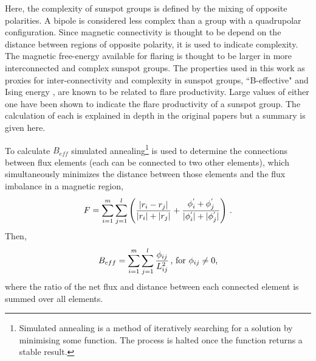 Here, the complexity of sunspot groups is defined by the mixing of opposite polarities. A bipole is considered less complex than a group with a quadrupolar configuration. Since magnetic connectivity is thought to be depend on the distance between regions of opposite polarity, it is used to indicate complexity. The magnetic free-energy available for flaring is thought to be larger in more interconnected and complex sunspot groups\citep{Schrijver:2009,Falconer:2009,Georgoulis:2007}. The properties used in this work as proxies for inter-connectivity and complexity in sunspot groups, ``B-effective"  \citep[$B_{eff}$;][]{Georgoulis:2007} and Ising energy \citep{Ahmed:2010}, are known to be related to flare productivity. Large values of either one have been shown to indicate the flare productivity of a sunspot group. The calculation of each is explained in depth in the original papers but a summary is given here. 

To calculate $B_{eff}$ simulated annealing\footnote{Simulated annealing is a method of iteratively searching for a solution by minimising some function. The process is halted once the function returns a stable result.} \citep{Press:1992} is used to determine the connections between flux elements (each can be connected to two other elements), which simultaneously minimizes the distance between those elements and the flux imbalance in a magnetic region, 
\begin{equation}
F=\sum^m_{i=1} \sum^l_{j=1} \left( \frac{|r_i-r_j|}{|r_i|+|r_j|} + \frac{\phi_i^{'}+\phi_j^{'}}{|\phi_i^{'}| + |\phi_j^{'}|} \right) \mbox{\,.}
\end{equation}
Then,
\begin{equation}
B_{eff}=\sum^m_{i=1} \sum^l_{j=1} \frac{\phi_{ij}}{L^2_{ij}} \mbox{\,, for } \phi_{ij} \neq 0 \mbox{,}
\end{equation}
where the ratio of the net flux and distance between each connected element is summed over all elements. 

